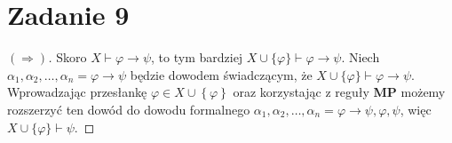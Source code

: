 \newpage

\section*{Zadanie 9}

\begin{proof}[\( (\Rightarrow) \)]
    Skoro \( X \vdash \varphi \to \psi \), to tym bardziej \( X \cup \{\varphi\} \vdash \varphi \to \psi \). Niech \( \alpha_1, \alpha_2, \ldots, \alpha_n = \varphi \to \psi \) będzie dowodem świadczącym, że \( X \cup \{ \varphi \} \vdash \varphi \to \psi \). Wprowadzając przesłankę \( \varphi \in X \cup \left\{ \varphi \right\} \) oraz korzystając z reguły \textbf{MP} możemy rozszerzyć ten dowód do dowodu formalnego \( \alpha_1, \alpha_2, \ldots, \alpha_n = \varphi \to \psi, \varphi, \psi \), więc \( X \cup \{\varphi\} \vdash \psi \).
\end{proof}

